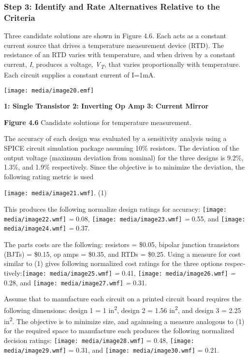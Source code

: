 \subsubsection*{Step 3: Identify and Rate Alternatives Relative to the
Criteria}\label{step-3-identify-and-rate-alternatives-relative-to-the-criteria}

Three candidate solutions are shown in Figure 4.6. Each acts as a
constant current source that drives a temperature measurement device
(RTD). The resistance of an RTD varies with temperature, and when driven
by a constant cur­rent, \emph{I}, produces a voltage,
\emph{V\textsubscript{T}}, that varies proportionally with temperature.
Each circuit supplies a constant current of I=1mA.

\texttt{[image: media/image20.emf]}

\textbf{1: Single Transistor 2: Inverting Op Amp 3: Current Mirror}

\textbf{Figure 4.6} Candidate solutions for temperature measurement.

The accuracy of each design was evaluated by a sensitivity analysis
using a SPICE cir­cuit simulation package assuming 10\% resistors. The
deviation of the output volt­age (maximum deviation from nominal) for the
three designs is 9.2\%, 1.3\%, and 1.9\% respectively. Since the
objective is to minimize the deviation, the following rating metric is
used

\texttt{[image: media/image21.wmf]}. (1)

This produces the following normalize design ratings for accuracy:
\texttt{[image: media/image22.wmf]} \emph{=} 0.08,
\texttt{[image: media/image23.wmf]} \emph{=} 0.55, and
\texttt{[image: media/image24.wmf]} \emph{=} 0.37.

The parts costs are the following: resistors = \$0.05, bipolar junction
transistors (BJTs) = \$0.15, op amps = \$0.35, and RTDs = \$0.25. Using
a measure for cost similar to (1) gives following normalized cost
ratings for the three options
respec­tively:\texttt{[image: media/image25.wmf]} \emph{=} 0.41,
\texttt{[image: media/image26.wmf]} \emph{=} 0.28, and
\texttt{[image: media/image27.wmf]} \emph{=} 0.31.

Assume that to manufacture each circuit on a printed circuit board
requires the following dimen­sions: design 1 = 1 in\textsuperscript{2},
design 2 = 1.56 in\textsuperscript{2}, and design 3 = 2.25
in\textsuperscript{2}. The objective is to minimize size, and againusing
a measure analogous to (1) for the required space to manufacture each
produces the following normalized decision ratings:
\texttt{[image: media/image28.wmf]} = 0.48,
\texttt{[image: media/image29.wmf]} = 0.31, and
\texttt{[image: media/image30.wmf]} = 0.21.

